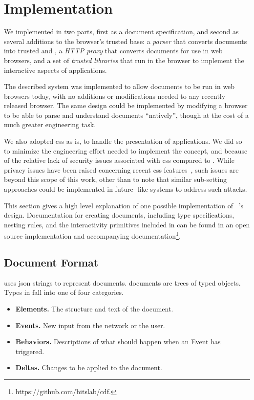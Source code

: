 \section{Implementation}
\label{future-web:implementation}

We implemented \CDF in two parts, first as a document specification, and second
as several additions to the browser's trusted base: a \emph{parser} that
converts \CDF documents into trusted \HTML and \JS, a \emph{HTTP proxy} that
converts \CDF documents for use in web browsers, and a set of \emph{trusted \JS
libraries} that run in the browser to implement the interactive aspects of \CDF
applications.

The described system was implemented to allow \CDF documents to be run in web
browsers today, with no additions or modifications needed to any recently
released browser.  The same design could be implemented by modifying a browser
to be able to parse and understand \CDF documents ``natively'', though at the
cost of a much greater engineering task.

We also adopted \gls{css} as is, to handle the presentation
of \CDF applications.  We did so to minimize the engineering effort needed
to implement the \CDF concept, and because of the relative lack of security
issues associated with \gls{css} compared to \JS.  While privacy issues
have been raised concerning recent \gls{css} features~\cite{crookedstylesheets},
such issues are beyond this scope of this work, other than to note
that similar sub-setting approaches could be implemented in future-\CDF-like
systems to address such attacks.

This section gives a high level explanation of one possible implementation
of \CDF~'s design.  Documentation for creating \CDF documents, including
type specifications, nesting rules, and the interactivity primitives
included in \CDF can be found in an open source implementation and accompanying
documentation\footnote{https://github.com/bitslab/cdf.}.

\subsection{Document Format}
\CDF uses \gls{json} strings to represent documents.  \CDF documents are
trees of typed objects.  Types in \CDF fall into one of four categories.

\begin{itemize}[itemsep=-2pt]
  \item \textbf{Elements.} The structure and text of the document.
  \item \textbf{Events.} New input from the network or the user.
  \item \textbf{Behaviors.} Descriptions of what should happen when an Event has
                   triggered.
  \item \textbf{Deltas.} Changes to be applied to the document.
\end{itemize}

